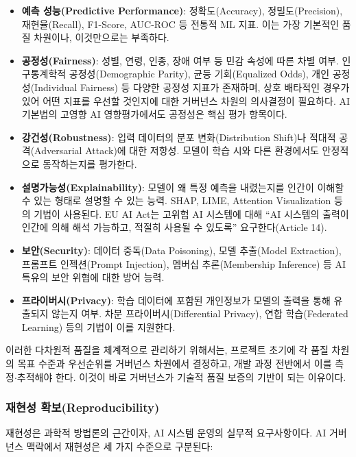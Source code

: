 \begin{itemize}
    \item \textbf{예측 성능(Predictive Performance)}: 정확도(Accuracy), 정밀도(Precision), 재현율(Recall), F1-Score, AUC-ROC 등 전통적 ML 지표. 이는 가장 기본적인 품질 차원이나, 이것만으로는 부족하다.
    \item \textbf{공정성(Fairness)}: 성별, 연령, 인종, 장애 여부 등 민감 속성에 따른 차별 여부. 인구통계학적 공정성(Demographic Parity), 균등 기회(Equalized Odds), 개인 공정성(Individual Fairness) 등 다양한 공정성 지표가 존재하며, 상호 배타적인 경우가 있어 어떤 지표를 우선할 것인지에 대한 거버넌스 차원의 의사결정이 필요하다. AI 기본법의 고영향 AI 영향평가에서도 공정성은 핵심 평가 항목이다.
    \item \textbf{강건성(Robustness)}: 입력 데이터의 분포 변화(Distribution Shift)나 적대적 공격(Adversarial Attack)에 대한 저항성. 모델이 학습 시와 다른 환경에서도 안정적으로 동작하는지를 평가한다.
    \item \textbf{설명가능성(Explainability)}: 모델이 왜 특정 예측을 내렸는지를 인간이 이해할 수 있는 형태로 설명할 수 있는 능력. SHAP\cite{lundberg2017unified}, LIME\cite{ribeiro2016why}, Attention Visualization 등의 기법이 사용된다. EU AI Act는 고위험 AI 시스템에 대해 ``AI 시스템의 출력이 인간에 의해 해석 가능하고, 적절히 사용될 수 있도록'' 요구한다(Article 14).
    \item \textbf{보안(Security)}: 데이터 중독(Data Poisoning), 모델 추출(Model Extraction), 프롬프트 인젝션(Prompt Injection), 멤버십 추론(Membership Inference) 등 AI 특유의 보안 위협에 대한 방어 능력.
    \item \textbf{프라이버시(Privacy)}: 학습 데이터에 포함된 개인정보가 모델의 출력을 통해 유출되지 않는지 여부. 차분 프라이버시(Differential Privacy)\cite{dwork2014algorithmic}, 연합 학습(Federated Learning)\cite{mcmahan2017communication} 등의 기법이 이를 지원한다.
\end{itemize}

이러한 다차원적 품질을 체계적으로 관리하기 위해서는, 프로젝트 초기에 각 품질 차원의 목표 수준과 우선순위를 거버넌스 차원에서 결정하고, 개발 과정 전반에서 이를 측정$\cdot$추적해야 한다. 이것이 바로 거버넌스가 기술적 품질 보증의 기반이 되는 이유이다.

\subsubsection*{재현성 확보(Reproducibility)}
재현성은 과학적 방법론의 근간이자, AI 시스템 운영의 실무적 요구사항이다. AI 거버넌스 맥락에서 재현성은 세 가지 수준으로 구분된다:

